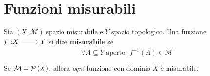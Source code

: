 \section{Funzioni misurabili}
\begin{define}
	Sia $\left(X, \mathcal{M}\right)$ spazio misurabile e $Y$ spazio topologico. Una funzione $\funz{f}{X}{Y}$ si dice \textbf{misurabile} se \begin{equation}
		\forall A\subseteq Y\text{ aperto},\ f^{-1}\left(A\right)\in\mathcal{M}
	\end{equation}
\end{define}
\begin{observe}
	Se $\mathcal{M}=\mathcal{P}\left(X\right)$, allora \textit{ogni} funzione con dominio $X$ è misurabile.
\end{observe}
